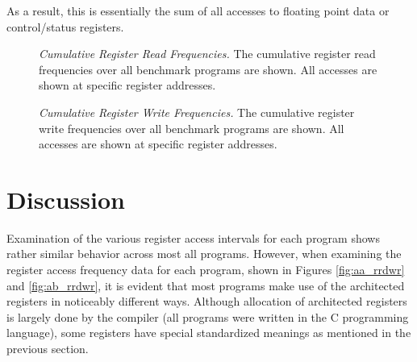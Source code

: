\documentclass[10pt,dvips]{article}
\begin{document}
As a result, this is essentially the sum of all accesses to floating point
data or control/status registers.
%
\begin{figure}
\centering
{}
\caption{{\em Cumulative Register Read Frequencies.} 
The cumulative register read frequencies over all benchmark programs
are shown.
All accesses are shown at specific register addresses.}
\label{fig:cum_rread}
\end{figure}
%
\begin{figure}
\centering
{}
\caption{{\em Cumulative Register Write Frequencies.} 
The cumulative register write frequencies over all benchmark programs
are shown.
All accesses are shown at specific register addresses.}
\label{fig:cum_rwrite}
\end{figure}
%
%
\section{Discussion}
%
Examination of the various register access intervals for
each program shows rather similar behavior across most all
programs.
However, when examining the register access frequency data for
each program, shown in Figures \ref{fig:aa_rrdwr} and \ref{fig:ab_rrdwr},
it is evident that most programs make use of the architected registers
in noticeably different ways. 
Although allocation of architected registers is largely done by
the compiler (all programs were written in the C programming language),
some registers have special standardized meanings as mentioned
in the previous section.
\end{document}
